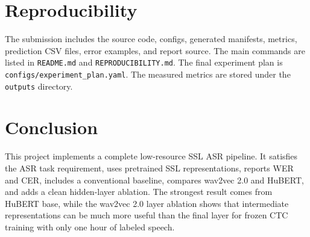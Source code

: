 \documentclass{article}
\begin{document}
\section{Reproducibility}

The submission includes the source code, configs, generated manifests, metrics,
prediction CSV files, error examples, and report source. The main commands are
listed in \texttt{README.md} and \texttt{REPRODUCIBILITY.md}. The final
experiment plan is \texttt{configs/experiment\_plan.yaml}. The measured
metrics are stored under the \texttt{outputs} directory.

\section{Conclusion}

This project implements a complete low-resource SSL ASR pipeline. It satisfies
the ASR task requirement, uses pretrained SSL representations, reports WER and
CER, includes a conventional baseline, compares wav2vec 2.0 and HuBERT, and
adds a clean hidden-layer ablation. The strongest result comes from HuBERT
base, while the wav2vec 2.0 layer ablation shows that intermediate
representations can be much more useful than the final layer for frozen CTC
training with only one hour of labeled speech.



\end{document}
